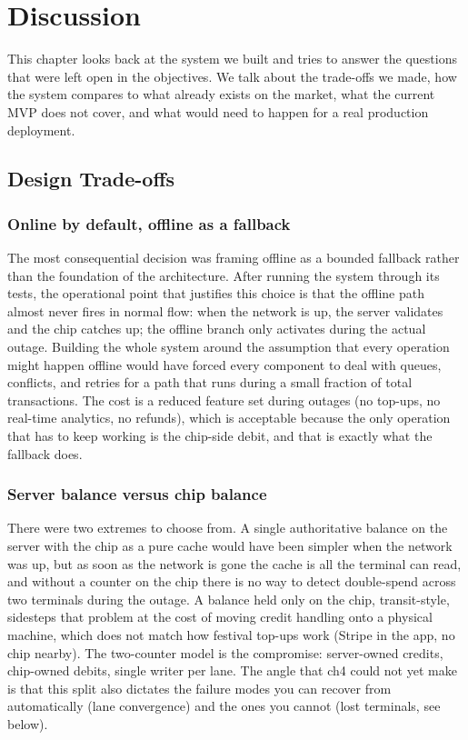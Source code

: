 \chapter{Discussion}
\label{chap:discussion}

This chapter looks back at the system we built and tries to answer the questions that were left open in the objectives. We talk about the trade-offs we made, how the system compares to what already exists on the market, what the current MVP does not cover, and what would need to happen for a real production deployment.

\section{Design Trade-offs}
\label{sec:trade-offs}

\subsection{Online by default, offline as a fallback}
\label{subsec:online-default}

The most consequential decision was framing offline as a bounded fallback rather than the foundation of the architecture. After running the system through its tests, the operational point that justifies this choice is that the offline path almost never fires in normal flow: when the network is up, the server validates and the chip catches up; the offline branch only activates during the actual outage. Building the whole system around the assumption that every operation might happen offline would have forced every component to deal with queues, conflicts, and retries for a path that runs during a small fraction of total transactions. The cost is a reduced feature set during outages (no top-ups, no real-time analytics, no refunds), which is acceptable because the only operation that has to keep working is the chip-side debit, and that is exactly what the fallback does.

\subsection{Server balance versus chip balance}
\label{subsec:server-vs-chip-balance}

There were two extremes to choose from. A single authoritative balance on the server with the chip as a pure cache would have been simpler when the network was up, but as soon as the network is gone the cache is all the terminal can read, and without a counter on the chip there is no way to detect double-spend across two terminals during the outage. A balance held only on the chip, transit-style, sidesteps that problem at the cost of moving credit handling onto a physical machine, which does not match how festival top-ups work (Stripe in the app, no chip nearby). The two-counter model is the compromise: server-owned credits, chip-owned debits, single writer per lane. The angle that ch4 could not yet make is that this split also dictates the failure modes you can recover from automatically (lane convergence) and the ones you cannot (lost terminals, see below).

